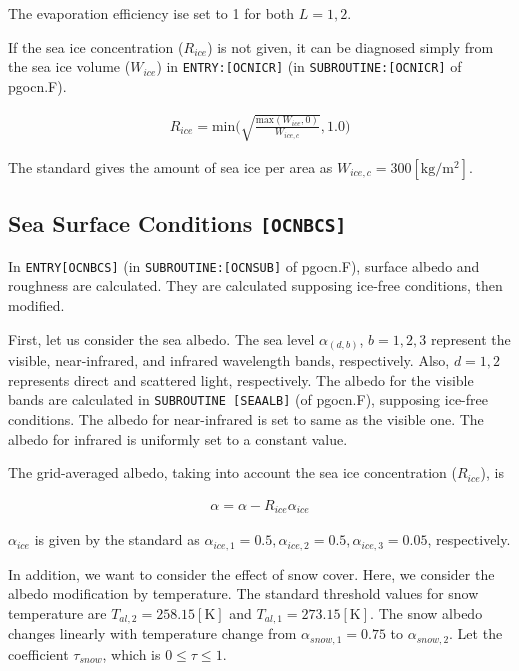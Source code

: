 \begin{itemize}
The evaporation efficiency ise set to 1 for both \(L=1, 2\).

If the sea ice concentration (\(R_{ice}\)) is not given, it can be
diagnosed simply from the sea ice volume (\(W_{ice}\)) in
\texttt{ENTRY:{[}OCNICR{]}} (in \texttt{SUBROUTINE:{[}OCNICR{]}} of
pgocn.F).

\begin{eqnarray}
R_{ice} = \mathrm{min}\Big(\sqrt{\frac{\mathrm{max}(W_{ice},0)}{W_{ice,c}}},1.0\Big)
\end{eqnarray}

The standard gives the amount of sea ice per area as
\(W_{ice,c}=300 \mathrm{[kg/m^2]}\).

\hypertarget{sea-surface-conditions-ocnbcs}{%
\subsection{\texorpdfstring{Sea Surface Conditions
\texttt{{[}OCNBCS{]}}}{Sea Surface Conditions {[}OCNBCS{]}}}\label{sea-surface-conditions-ocnbcs}}

In \texttt{ENTRY{[}OCNBCS{]}} (in \texttt{SUBROUTINE:{[}OCNSUB{]}} of
pgocn.F), surface albedo and roughness are calculated. They are
calculated supposing ice-free conditions, then modified.

First, let us consider the sea albedo. The sea level \(\alpha_{(d,b)}\),
\(b=1,2,3\) represent the visible, near-infrared, and infrared
wavelength bands, respectively. Also, \(d=1,2\) represents direct and
scattered light, respectively. The albedo for the visible bands are
calculated in \texttt{SUBROUTINE\ {[}SEAALB{]}} (of pgocn.F), supposing
ice-free conditions. The albedo for near-infrared is set to same as the
visible one. The albedo for infrared is uniformly set to a constant
value.

The grid-averaged albedo, taking into account the sea ice concentration
(\(R_{ice}\)), is

\begin{eqnarray}
    \alpha = \alpha -R_{ice} \alpha_{ice}
\end{eqnarray}

\(\alpha_{ice}\) is given by the standard as
\(\alpha_{ice,1}=0.5,\alpha_{ice,2}=0.5,\alpha_{ice,3}=0.05\),
respectively.

In addition, we want to consider the effect of snow cover. Here, we
consider the albedo modification by temperature. The standard threshold
values for snow temperature are \(T_{al,2}=258.15 \mathrm{[K]}\) and
\(T_{al,1}=273.15 \mathrm{[K]}\). The snow albedo changes linearly with
temperature change from \(\alpha_{snow,1}=0.75\) to
\(\alpha_{ snow,2}\). Let the coefficient \(\tau_{snow}\), which is
\(0\le \tau \le 1\).


\end{itemize}
